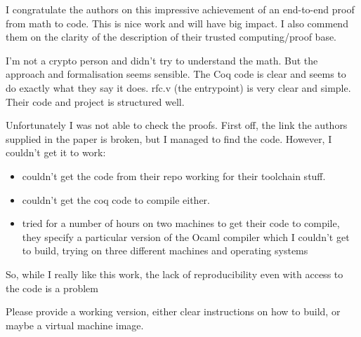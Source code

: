 I congratulate the authors on this impressive achievement of an end-to-end proof from math to code. This is nice work and will have big impact. I also commend them on the clarity of the description of their trusted computing/proof base.

I'm not a crypto person and didn't try to understand the math. But the approach and formalisation seems sensible. The Coq code is clear and seems to do exactly what they say it does. rfc.v (the entrypoint) is very clear and simple. Their code and project is structured well.

Unfortunately I was not able to check the proofs. First off, the link the authors supplied in the paper is broken, but I managed to find the code. However, I couldn't get it to work:
\begin{itemize}
    \item couldn't get the code from their repo working for their toolchain stuff.
    \item couldn't get the coq code to compile either.
    \item tried for a number of hours on two machines to get their code to compile, they specify a particular version of the Ocaml compiler which I couldn't get to build, trying on three different machines and operating systems
\end{itemize}

So, while I really like this work, the lack of reproducibility even with access to the code is a problem

\begin{center}
\end{center}

Please provide a working version, either clear instructions on how to build, or maybe a virtual machine image.


